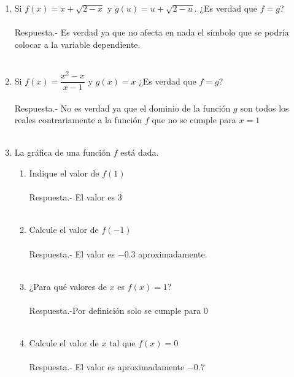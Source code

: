     \begin{enumerate}
	
    \item Si $f(x)=x + \sqrt{2-x}$ y $g(u)=u+\sqrt{2-u}$. ¿Es verdad que $f=g$?\\\\
    Respuesta.-\; Es verdad ya que no afecta en nada el símbolo que se podría colocar a la variable dependiente.\\\\
	
	\item Si $f(x)=\dfrac{x^2-x}{x-1}$ y $g(x)=x$ ¿Es verdad que $f=g$?\\\\
	Respuesta.-\; No es verdad ya que el dominio de la función $g$ son todos los reales contrariamente a la función $f$ que no se cumple para $x=1$\\\\

	\item La gráfica de una función $f$ está dada.
	    \begin{enumerate}[\bfseries (a)]
		    \item Indique el valor de $f(1)$\\\\
		    Respuesta.-\; El valor es $3$\\\\ 

		    \item Calcule el valor de $f(-1)$\\\\
		    Respuesta.-\; El valor es $-0.3$ aproximadamente.\\\\

		    \item ¿Para qué valores de $x$ es $f(x)=1$?\\\\
		    Respuesta.-\;Por definición solo se cumple para $0$\\\\

		    \item Calcule el valor de $x$ tal que $f(x)=0$\\\\
		    Respuesta.-\; El valor es aproximadamente $-0.7$\\\\ 


\end{enumerate}
\end{enumerate}
